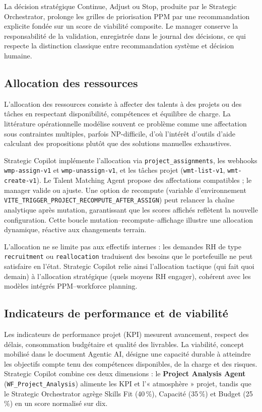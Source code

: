 La décision stratégique Continue, Adjust ou Stop, produite par le Strategic Orchestrator, prolonge les grilles de priorisation PPM par une recommandation explicite fondée sur un score de viabilité composite. Le manager conserve la responsabilité de la validation, enregistrée dans le journal des décisions, ce qui respecte la distinction classique entre recommandation système et décision humaine.

\subsection{Allocation des ressources}

L'allocation des ressources consiste à affecter des talents à des projets ou des tâches en respectant disponibilité, compétences et équilibre de charge. La littérature opérationnelle modélise souvent ce problème comme une affectation sous contraintes multiples, parfois NP-difficile, d'où l'intérêt d'outils d'aide calculant des propositions plutôt que des solutions manuelles exhaustives.

Strategic Copilot implémente l'allocation via \texttt{project\_assignments}, les webhooks \texttt{wmp-assign-v1} et \texttt{wmp-unassign-v1}, et les tâches projet (\texttt{wmt-list-v1}, \texttt{wmt-create-v1}). Le Talent Matching Agent propose des affectations compatibles ; le manager valide ou ajuste. Une option de recompute (variable d'environnement \texttt{VITE\_TRIGGER\_PROJECT\_RECOMPUTE\_AFTER\_ASSIGN}) peut relancer la chaîne analytique après mutation, garantissant que les scores affichés reflètent la nouvelle configuration. Cette boucle mutation--recompute--affichage illustre une allocation dynamique, réactive aux changements terrain.

L'allocation ne se limite pas aux effectifs internes : les demandes RH de type \texttt{recruitment} ou \texttt{reallocation} traduisent des besoins que le portefeuille ne peut satisfaire en l'état. Strategic Copilot relie ainsi l'allocation tactique (qui fait quoi demain) à l'allocation stratégique (quels moyens RH engager), cohérent avec les modèles intégrés PPM--workforce planning.

\subsection{Indicateurs de performance et de viabilité}

Les indicateurs de performance projet (KPI) mesurent avancement, respect des délais, consommation budgétaire et qualité des livrables. La viabilité, concept mobilisé dans le document Agentic AI, désigne une capacité durable à atteindre les objectifs compte tenu des compétences disponibles, de la charge et des risques. Strategic Copilot combine ces deux dimensions : le \textbf{Project Analysis Agent} (\texttt{WF\_Project\_Analysis}) alimente les KPI et l'« atmosphère » projet, tandis que le Strategic Orchestrator agrège Skills Fit (40\,\%), Capacité (35\,\%) et Budget (25\,\%) en un score normalisé sur dix.

